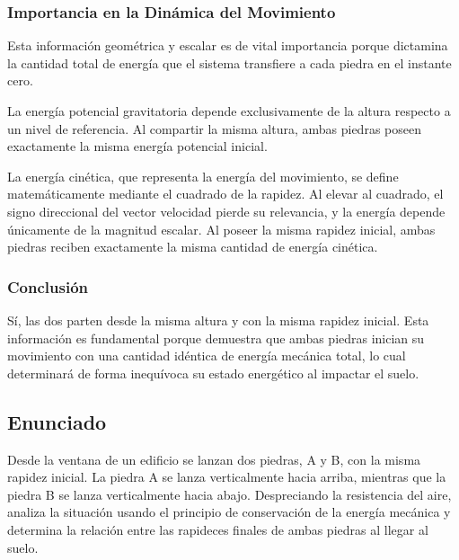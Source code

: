 \documentclass[12pt, a4paper]{article}
\begin{document}
\subsubsection*{Importancia en la Dinámica del Movimiento}

Esta información geométrica y escalar es de vital importancia porque dictamina la cantidad total de energía que el sistema transfiere a cada piedra en el instante cero. 

La energía potencial gravitatoria depende exclusivamente de la altura respecto a un nivel de referencia. Al compartir la misma altura, ambas piedras poseen exactamente la misma energía potencial inicial.

La energía cinética, que representa la energía del movimiento, se define matemáticamente mediante el cuadrado de la rapidez. Al elevar al cuadrado, el signo direccional del vector velocidad pierde su relevancia, y la energía depende únicamente de la magnitud escalar. Al poseer la misma rapidez inicial, ambas piedras reciben exactamente la misma cantidad de energía cinética.

\subsubsection*{Conclusión}

Sí, las dos parten desde la misma altura y con la misma rapidez inicial. Esta información es fundamental porque demuestra que ambas piedras inician su movimiento con una cantidad idéntica de energía mecánica total, lo cual determinará de forma inequívoca su estado energético al impactar el suelo.

\newpage

\subsection*{Enunciado}

Desde la ventana de un edificio se lanzan dos piedras, A y B, con la misma rapidez inicial. La piedra A se lanza verticalmente hacia arriba, mientras que la piedra B se lanza verticalmente hacia abajo. Despreciando la resistencia del aire, analiza la situación usando el principio de conservación de la energía mecánica y determina la relación entre las rapideces finales de ambas piedras al llegar al suelo.

\vspace{0.5cm}
\end{document}
